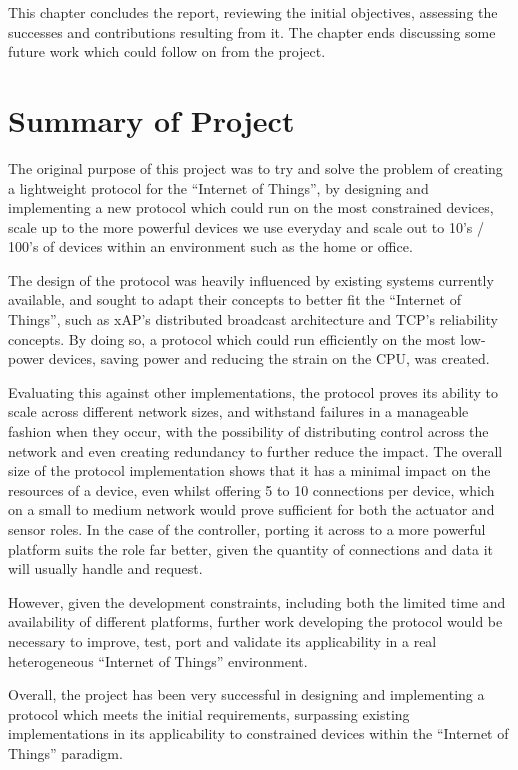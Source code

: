 This chapter concludes the report, reviewing the initial objectives, assessing the successes and contributions resulting from it.
The chapter ends discussing some future work which could follow on from the project.

\section{Summary of Project}
The original purpose of this project was to try and solve the problem of creating a lightweight protocol for the ``Internet of Things'', by designing and implementing a new protocol which could run on the most constrained devices, scale up to the more powerful devices we use everyday and scale out to 10's / 100's of devices within an environment such as the home or office.

The design of the protocol was heavily influenced by existing systems currently available, and sought to adapt their concepts to better fit the ``Internet of Things'', such as xAP's distributed broadcast architecture and TCP's reliability concepts. By doing so, a protocol which could run efficiently on the most low-power devices, saving power and reducing the strain on the CPU, was created.

Evaluating this against other implementations, the protocol proves its ability to scale across different network sizes, and withstand failures in a manageable fashion when they occur, with the possibility of distributing control across the network and even creating redundancy to further reduce the impact. The overall size of the protocol implementation shows that it has a minimal impact on the resources of a device, even whilst offering 5 to 10 connections per device, which on a small to medium network would prove sufficient for both the actuator and sensor roles. In the case of the controller, porting it across to a more powerful platform suits the role far better, given the quantity of connections and data it will usually handle and request.

However, given the development constraints, including both the limited time and availability of different platforms, further work developing the protocol would be necessary to improve, test, port and validate its applicability in a real heterogeneous ``Internet of Things'' environment.

Overall, the project has been very successful in designing and implementing a protocol which meets the initial requirements, surpassing existing implementations in its applicability to constrained devices within the ``Internet of Things'' paradigm.

